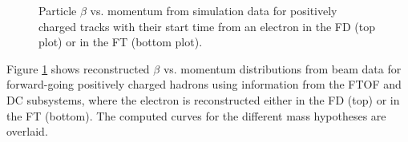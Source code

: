     \begin{figure}
        \centering{}
        \caption[Particle $\beta$ vs. momentum for positively charged tracks.]{Particle $\beta$ vs. momentum from simulation data for positively charged tracks with their start time from an electron in the FD (top plot) or in the FT (bottom plot).}
        \label{fig::pos_pid}
    \end{figure}

    Figure \ref{fig::pos_pid} shows reconstructed $\beta$ vs. momentum distributions from beam data for forward-going positively charged hadrons using information from the FTOF and DC subsystems, where the electron is reconstructed either in the FD (top) or in the FT (bottom).
    The computed curves for the different mass hypotheses are overlaid.

